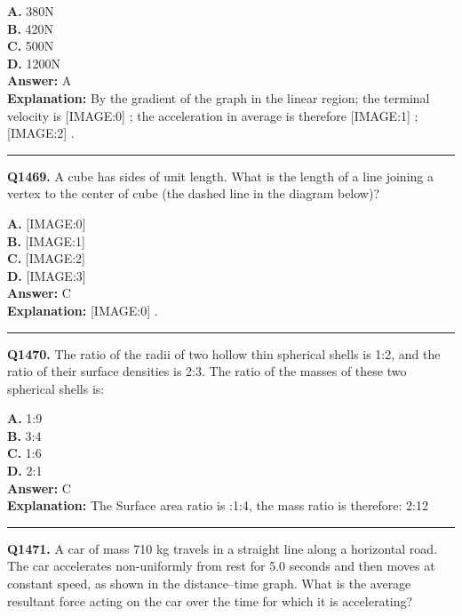 \documentclass[12pt]{article}
\begin{document}
\textbf{A.} 380N \\
\textbf{B.} 420N \\
\textbf{C.} 500N \\
\textbf{D.} 1200N \\

\textbf{Answer:} A \\
\textbf{Explanation:} By the gradient of the graph in the linear region; the terminal velocity is
[IMAGE:0]
; the acceleration in average is therefore
[IMAGE:1]
;
[IMAGE:2]
.

\hrule
\vspace{1em}


\noindent
\textbf{Q1469.} A cube has sides of unit length. What is the length of a line joining a vertex to the center of cube (the dashed line in the diagram below)?



\textbf{A.} [IMAGE:0] \\
\textbf{B.} [IMAGE:1] \\
\textbf{C.} [IMAGE:2] \\
\textbf{D.} [IMAGE:3] \\

\textbf{Answer:} C \\
\textbf{Explanation:} [IMAGE:0]
.

\hrule
\vspace{1em}


\noindent
\textbf{Q1470.} The ratio of the radii of two hollow thin spherical shells is 1:2, and the ratio of their surface densities is 2:3. The ratio of the masses of these two spherical shells is:



\textbf{A.} 1:9 \\
\textbf{B.} 3:4 \\
\textbf{C.} 1:6 \\
\textbf{D.} 2:1 \\

\textbf{Answer:} C \\
\textbf{Explanation:} The Surface area ratio is :1:4, the mass ratio is therefore: 2:12

\hrule
\vspace{1em}


\noindent
\textbf{Q1471.} A car of mass 710 kg travels in a straight line along a horizontal road.
The car accelerates non-uniformly from rest for 5.0 seconds and then moves at constant speed, as shown in the distance–time graph.
What is the average resultant force acting on the car over the time for which it is accelerating?
\end{document}

